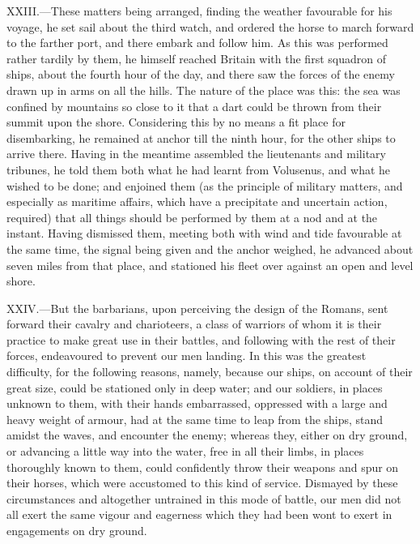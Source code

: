 XXIII.—These matters being arranged, finding the weather favourable for
his voyage, he set sail about the third watch, and ordered the horse to
march forward to the farther port, and there embark and follow him. As
this was performed rather tardily by them, he himself reached Britain
with the first squadron of ships, about the fourth hour of the day, and
there saw the forces of the enemy drawn up in arms on all the hills. The
nature of the place was this: the sea was confined by mountains so close
to it that a dart could be thrown from their summit upon the shore.
Considering this by no means a fit place for disembarking, he remained
at anchor till the ninth hour, for the other ships to arrive there.
Having in the meantime assembled the lieutenants and military tribunes,
he told them both what he had learnt from Volusenus, and what he wished
to be done; and enjoined them (as the principle of military matters, and
especially as maritime affairs, which have a precipitate and uncertain
action, required) that all things should be performed by them at a nod
and at the instant. Having dismissed them, meeting both with wind and
tide favourable at the same time, the signal being given and the anchor
weighed, he advanced about seven miles from that place, and stationed
his fleet over against an open and level shore.

XXIV.—But the barbarians, upon perceiving the design of the Romans,
sent forward their cavalry and charioteers, a class of warriors of whom
it is their practice to make great use in their battles, and following
with the rest of their forces, endeavoured to prevent our men landing.
In this was the greatest difficulty, for the following reasons, namely,
because our ships, on account of their great size, could be stationed
only in deep water; and our soldiers, in places unknown to them, with
their hands embarrassed, oppressed with a large and heavy weight of
armour, had at the same time to leap from the ships, stand amidst the
waves, and encounter the enemy; whereas they, either on dry ground, or
advancing a little way into the water, free in all their limbs, in
places thoroughly known to them, could confidently throw their weapons
and spur on their horses, which were accustomed to this kind of service.
Dismayed by these circumstances and altogether untrained in this mode of
battle, our men did not all exert the same vigour and eagerness which
they had been wont to exert in engagements on dry ground.

